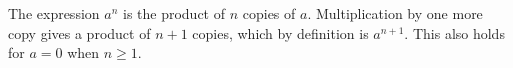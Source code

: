 The expression $a^n$ is the product of $n$ copies of $a$. Multiplication by one more copy gives a product of $n+1$ copies, which by definition is $a^{n+1}$. This also holds for $a=0$ when $n\ge1$.
